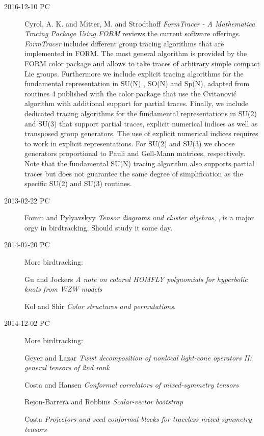 \begin{description}
\item[2016-12-10 PC]
Cyrol, A. K. and Mitter, M. and Strodthoff
{\em {FormTracer - A Mathematica Tracing Package Using FORM}}
reviews the current software offerings.
\emph{FormTracer} includes different group tracing algorithms that are
implemented in FORM. The most general algorithm is
provided by the FORM color package and allows to take traces of
arbitrary simple compact Lie groups. Furthermore we include explicit tracing
algorithms for the fundamental representation in SU(N) , SO(N) and Sp(N),
adapted from routines 4 published with the color package that
use the Cvitanovi\'c algorithm with additional support for partial
traces. Finally, we include dedicated tracing algorithms for the fundamental
representations in SU(2) and SU(3) that support partial traces, explicit
numerical indices as well as transposed group generators. The use of explicit
numerical indices requires to work in explicit representations.  For SU(2)
and SU(3) we choose generators proportional to Pauli and Gell-Mann matrices,
respectively. Note that the fundamental SU(N) tracing algorithm also supports
partial traces but does not guarantee the same degree of simplification as
the specific SU(2) and SU(3) routines.

\item[2013-02-22 PC] Fomin and Pylyavskyy
{\em Tensor diagrams and cluster algebras}, {},
is a major orgy in birdtracking. Should study it some day.

\item[2014-07-20 PC] More birdtracking:

Gu and Jockers
 {\em A note on colored {HOMFLY} polynomials for hyperbolic knots
      from {WZW} models}

Kol and Shir {\em Color structures and permutations}.

\item[2014-12-02 PC] More birdtracking:

Geyer and Lazar
{\em Twist decomposition of nonlocal light-cone operators
{II:} general tensors of 2nd rank}

Costa and Hansen
{\em Conformal correlators of mixed-symmetry tensors}

Rejon-Barrera and Robbins {\em Scalar-vector bootstrap}

Costa \etal{}
{\em Projectors and seed conformal blocks for traceless mixed-symmetry tensors}


\end{description}
